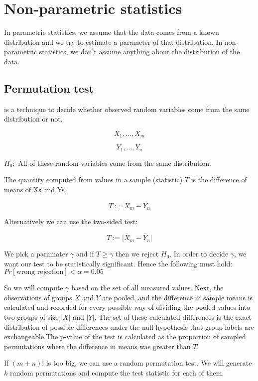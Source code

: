 \chapter{Non-parametric statistics}

In parametric statistics, we assume that the data comes from a known distribution and we try to estimate a parameter of that distribution. In non-parametric statistics, we don't assume anything about the distribution of the data.

\section{Permutation test}

is a technique to decide whether observed random variables come from the same distribution or not.

$$
X_1, \dots, X_m
$$

$$
Y_1, \dots, Y_n
$$

$H_0:$ All of these random variables come from the same distribution.

The quantity computed from values in a sample (statistic) $T$ is the difference of means of Xs and Ys.

$$
T := \bar{X}_m - \bar{Y}_n
$$

Alternatively we can use the two-sided test:

$$
T := \vert \bar{X}_m - \bar{Y}_n \vert
$$

We pick a paramater $\gamma$ and if $T \geq \gamma$ then we reject $H_0$. In order to decide $\gamma$, we want our test to be statistically significant. Hence the following must hold: \newline $Pr[\text{wrong rejection} ] < \alpha = 0.05$

So we will compute $\gamma$ based on the set of all measured values. Next, the observations of groups $X$ and $Y$ are pooled, and the difference in sample means is calculated and recorded for every possible way of dividing the pooled values into two groups of size $\vert X \vert$ and $\vert Y \vert$. The set of these calculated differences is the exact distribution of possible differences under the null hypothesis that group labels are exchangeable.The p-value of the test is calculated as the proportion of sampled permutations where the difference in means was greater than $T$.

If $(m+n)!$ is too big, we can use a random permutation test. We will generate $k$ random permutations and compute the test statistic for each of them.


